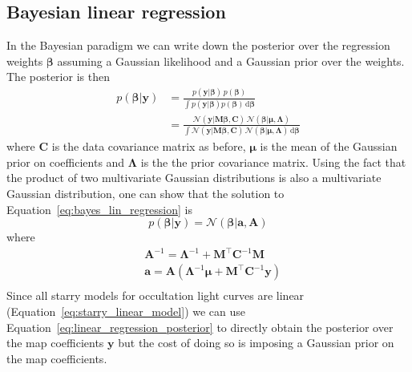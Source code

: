 \documentclass[12pt,dvipsnames]{report}
\newcommand{\ud}{\,\mathrm{d}}
\newcommand{\ssf}[1]{\textsf{#1}}
\renewcommand{\vec}[1]{\boldsymbol{\mathbf{#1}}}
\begin{document}
\subsection{Bayesian linear regression}
In the Bayesian paradigm we can write down the posterior over the regression
weights $\vec\beta$ assuming a Gaussian likelihood and a Gaussian prior over the
weights. The posterior is then
\begin{align}
    p(\vec\beta|\vec{y}) & = \frac{p(\vec{y}\lvert \vec\beta)\,p(\vec\beta)}{\int p(\vec{y}\lvert \vec\beta)p(\vec\beta) \ud\vec\beta}                                                                                                                                                 \\
                       & = \frac{    \mathcal{N}(\vec{y} \lvert\vec{M} \vec\beta, \vec{C}) \,\mathcal{N}(\vec\beta \lvert\vec{\mu}, \vec{\Lambda})}{\int \mathcal{N}(\vec{y} \lvert\vec{M} \vec\beta, \vec{C}) \,\mathcal{N}(\vec\beta \lvert\vec{\mu}, \vec{\Lambda}) \ud\vec\beta}
    \label{eq:bayes_lin_regression}
\end{align}
where $\vec{C}$ is the data covariance matrix as before, $\vec{\mu}$ is the mean
of the Gaussian prior on coefficients and $\vec{\Lambda}$ is the the prior covariance matrix.
Using the fact that the product of two multivariate Gaussian distributions is also a
multivariate Gaussian distribution, one can show that
the solution to Equation~\ref{eq:bayes_lin_regression} is
\citep[see for example][]{arXiv:2005.14199}
\begin{equation}
    p(\vec\beta|\vec{y}) =\mathcal{N}(\vec\beta \lvert\vec{a}, \vec{A})
    \label{eq:linear_regression_posterior}
\end{equation}
where
\begin{align}
     & \vec{A}^{-1}   =\vec{\Lambda}^{-1}+\vec{M}^{\intercal} \vec{C}^{-1} \vec{M}                                                     \\
     & \vec{a}     =\vec{A} \left(\boldsymbol{\Lambda}^{-1} \boldsymbol{\mu}+\vec{M}^{\intercal} \mathbf{C}^{-1} \boldsymbol{y}\right) \\
\end{align}
Since all \ssf{starry} models for occultation light curves are linear
(Equation~\ref{eq:starry_linear_model}) we can use Equation~\ref{eq:linear_regression_posterior}
to directly obtain the posterior over the map coefficients $\mathbf{y}$ but the cost
of doing so is imposing a Gaussian prior on the map coefficients.
\end{document}
